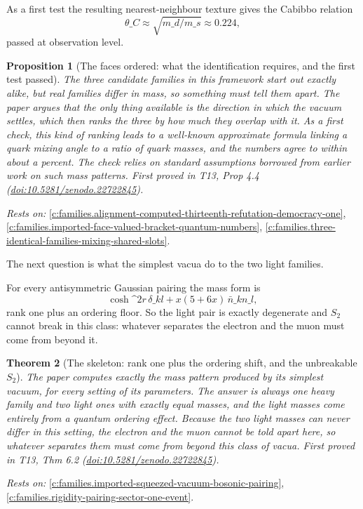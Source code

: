 \documentclass[11pt]{article}
\newtheorem{theorem}{Theorem}[section]
\newtheorem{proposition}[theorem]{Proposition}
\theoremstyle{definition}
\theoremstyle{plain}
\begin{document}
As a first test the resulting nearest-neighbour texture gives the Cabibbo relation \[ \theta\_{C} \approx \sqrt{m\_{d}/m\_{s}} \approx 0.224, \] passed at observation level.

\begin{proposition}[The faces ordered: what the identification requires, and the first test passed]\label{c:families.faces-ordered-what-identification-requires-first}
The three candidate families in this framework start out exactly alike, but real families differ in mass, so something must tell them apart. The paper argues that the only thing available is the direction in which the vacuum settles, which then ranks the three by how much they overlap with it. As a first check, this kind of ranking leads to a well-known approximate formula linking a quark mixing angle to a ratio of quark masses, and the numbers agree to within about a percent. The check relies on standard assumptions borrowed from earlier work on such mass patterns.
\emph{First proved in} T13, Prop 4.4 (\href{https://doi.org/10.5281/zenodo.22722845}{doi:10.5281/zenodo.22722845}).
\end{proposition}
\noindent\emph{Rests on:} \ref{c:families.alignment-computed-thirteenth-refutation-democracy-one}, \ref{c:families.imported-face-valued-bracket-quantum-numbers}, \ref{c:families.three-identical-families-mixing-shared-slots}.

The next question is what the simplest vacua do to the two light families.

For every antisymmetric Gaussian pairing the mass form is \[ \cosh\^{}{2}r\,\delta\_{kl} + x(5 + 6x)\,\bar{n}\_{k}n\_{l}, \] rank one plus an ordering floor. So the light pair is exactly degenerate and $S_{2}$ cannot break in this class: whatever separates the electron and the muon must come from beyond it.

\begin{theorem}[The skeleton: rank one plus the ordering shift, and the unbreakable $S_{2}$]\label{c:families.skeleton-rank-one-plus-ordering-shift}
The paper computes exactly the mass pattern produced by its simplest vacuum, for every setting of its parameters. The answer is always one heavy family and two light ones with exactly equal masses, and the light masses come entirely from a quantum ordering effect. Because the two light masses can never differ in this setting, the electron and the muon cannot be told apart here, so whatever separates them must come from beyond this class of vacua.
\emph{First proved in} T13, Thm 6.2 (\href{https://doi.org/10.5281/zenodo.22722845}{doi:10.5281/zenodo.22722845}).
\end{theorem}
\noindent\emph{Rests on:} \ref{c:families.imported-squeezed-vacuum-bosonic-pairing}, \ref{c:families.rigidity-pairing-sector-one-event}.
\end{document}
